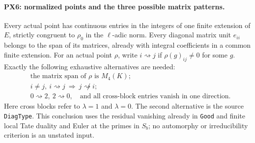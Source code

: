 \paragraph{PX6: normalized points and the three possible matrix patterns.}
\label{claim:PX6}
Every actual point has continuous entries in the integers
of one finite extension of $E$, strictly congruent to
$\rho_0$ in the $\ell$-adic norm.  Every diagonal matrix
unit $e_{ii}$ belongs to the span of its matrices, already
with integral coefficients in a common finite extension.
For an actual point $\rho$, write $i\rightsquigarrow j$
if $\rho(g)_{ij}\ne0$ for some $g$.  Exactly the following
exhaustive alternatives are needed:
\[
 \begin{split}
 &\text{the matrix span of $\rho$ is $M_4(K)$;}\\
 &i\ne j,\ i\rightsquigarrow j\ \Longrightarrow\
                                      j\not\rightsquigarrow i;\\
 &0\rightsquigarrow2,\ 2\rightsquigarrow0,
 \quad\text{and all cross-block entries vanish in one direction.}
 \end{split}
 \tag{PX.14}
\]
Here cross blocks refer to $\lambda=1$ and $\lambda=0$.
The second alternative is the source \texttt{DiagType}.
This conclusion uses the residual vanishing already in
\texttt{Good} and finite local Tate duality and Euler at
the primes in $S_b$; no automorphy or irreducibility
criterion is an unstated input.

